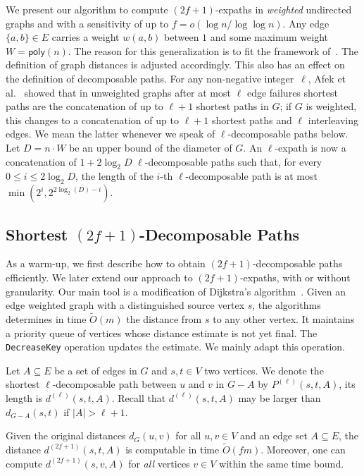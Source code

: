 \documentclass{theoretics}
\newcommand*{\Otilde}{\widetilde{O}}
\newcommand*{\poly}{\textsf{poly}}
\renewcommand{\le}{\leqslant}
\begin{document}
We present our algorithm to compute $(2f{+}1)$-expaths in \emph{weighted} undirected graphs
and with a sensitivity of up to $f = o(\log n/\log\log n)$.
Any edge $\{a,b\} \in E$ carries a weight $w(a,b)$ between $1$ and some maximum weight $W = \poly(n)$.
The reason for this generalization is to fit the framework of~\cite{ChCoFiKa17}.
The definition of graph distances is adjusted accordingly.
This also has an effect on the definition of decomposable paths.
For any non-negative integer~$\ell$, 
Afek et al.~\cite[Theorem~1]{Afek02RestorationbyPathConcatenation_journal}
showed that in unweighted graphs after at most $\ell$ edge failures
shortest paths are the concatenation of up to $\ell+1$ shortest paths in $G$;
if $G$ is weighted, this changes to a
concatenation of up to $\ell+1$ shortest paths and $\ell$ interleaving edges.
We mean the latter whenever we speak of $\ell$-decomposable paths below.
Let $D = n \cdot W$ be an upper bound of the diameter of $G$.
An $\ell$-expath is now a concatenation of $1+2\log_2 D$ $\ell$-decomposable paths
such that, for every $0 \le i \le 2\log_2 D$,
the length of the $i$-th \mbox{$\ell$-decomposable} path is at most $\min(2^i, 2^{2\log_2(D) - i})$.


\subsection{Shortest \texorpdfstring{$(2f{+}1)$}{(2f+1)}-Decomposable Paths}
\label{subsec:improved_preproc_decomposable}

As a warm-up, we first describe how to obtain 
$(2f{+}1)$-decomposable paths efficiently.
We later extend our approach to $(2f{+}1)$-expaths,
with or without granularity.
Our main tool is a modification of Dijkstra's algorithm~\cite[Chapter 22.3]{clrs}.
Given an edge weighted graph with a distinguished source vertex $s$,
the algorithms determines in time $\Otilde(m)$ the distance from $s$ to any other vertex.
It maintains a priority queue of vertices whose distance estimate
is not yet final.
The \texttt{DecreaseKey} operation updates the estimate.
We mainly adapt this operation.


Let $A \subseteq E$ be a set of edges in $G$ and $s,t \in V$ two vertices.
We denote the shortest $\ell$-decomposable path between $u$ and $v$ in $G-A$ by $P^{(\ell)}(s,t,A)$,
its length is $d^{(\ell)}(s,t,A)$.
Recall that $d^{(\ell)}(s,t,A)$ may be larger than $d_{G-A}(s,t)$ if $|A| > \ell + 1$.

\begin{lemma}
\label{lem:f-decomposable}
Given the original distances $d_G(u,v)$ for all $u,v \in V$
and an edge set $A \subseteq E$, 
the distance $d^{(2f+1)}(s, t, A)$ is computable in time $\Otilde(fm)$.
Moreover, one can compute $d^{(2f+1)}(s, v, A)$
for \emph{all} vertices $v \in V$ within the same time bound.
\end{lemma}
\end{document}
